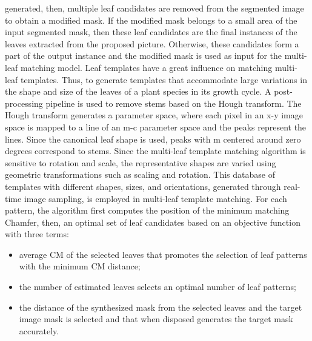 generated, then, multiple leaf candidates are removed from the segmented image to obtain a modified mask. If the modified mask belongs to a small area of
the input segmented mask, then these leaf candidates are the final instances of the leaves extracted from the proposed picture. Otherwise, these candidates
form a part of the output instance and the modified mask is used as input for the multi-leaf matching model.
Leaf templates have a great influence on matching multi-leaf templates. Thus, to generate templates that accommodate large variations in
the shape and size of the leaves of a plant species in its growth cycle. A post-processing pipeline is used to remove stems based on the Hough
transform. The Hough transform generates a parameter space, where each pixel in an x-y image space is mapped to a line of an m-c parameter space
and the peaks represent the lines. Since the canonical leaf shape is used, peaks with m centered around zero degrees correspond to stems. Since
the multi-leaf template matching algorithm is sensitive to rotation and scale, the representative shapes are varied using geometric transformations
such as scaling and rotation. This database of templates with different shapes, sizes, and orientations, generated through real-time image sampling,
is employed in multi-leaf template matching. For each pattern, the algorithm first computes the position of the minimum matching Chamfer, then, an
optimal set of leaf candidates based on an objective function with three terms: 
\begin{itemize}
    \item average CM of the selected leaves that promotes the selection of leaf patterns with the minimum CM distance;
    \item the number of estimated leaves selects an optimal number of leaf patterns; 
    \item the distance of the synthesized mask from the selected leaves and the target image mask is selected and that when disposed generates the target mask accurately.
\end{itemize}

